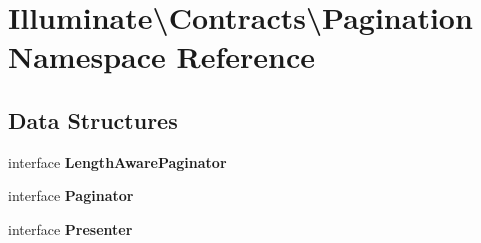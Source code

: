 \section{Illuminate\textbackslash{}Contracts\textbackslash{}Pagination Namespace Reference}
\label{namespace_illuminate_1_1_contracts_1_1_pagination}
\subsection*{Data Structures}
\begin{DoxyCompactItemize}
\item 
interface {\bf Length\+Aware\+Paginator}
\item 
interface {\bf Paginator}
\item 
interface {\bf Presenter}
\end{DoxyCompactItemize}

